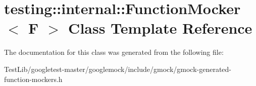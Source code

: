 \hypertarget{classtesting_1_1internal_1_1FunctionMocker}{}\section{testing\+:\+:internal\+:\+:Function\+Mocker$<$ F $>$ Class Template Reference}
\label{classtesting_1_1internal_1_1FunctionMocker}


The documentation for this class was generated from the following file\+:\begin{DoxyCompactItemize}
\item 
Test\+Lib/googletest-\/master/googlemock/include/gmock/gmock-\/generated-\/function-\/mockers.\+h\end{DoxyCompactItemize}
